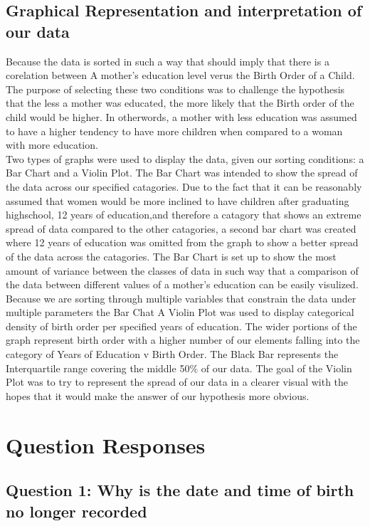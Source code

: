 \documentclass[10pt]{article}
\begin{document}
\subsection{Graphical Representation and interpretation of our data}
Because the data is sorted in such a way that should imply that there is a corelation between A mother's education level verus the Birth Order of a Child.
The purpose of selecting these two conditions was to challenge the hypothesis that the less a mother was educated, the more likely that the Birth order of 
the child would be higher. In otherwords, a mother with less education was assumed to have a higher tendency to have more children when compared to a woman
with more education.\\ Two types of graphs were used to display the data, given our sorting conditions: a Bar Chart and a Violin Plot.
The Bar Chart was intended to show the spread of the data across our specified catagories. Due to the fact that it can be reasonably assumed
that women would be more inclined to have children after graduating highschool, 12 years of education,and therefore a catagory that shows an extreme spread of data compared to the other catagories,
a second bar chart was created where 12 years of education was omitted from the graph to show a better spread of the data across the catagories.
The Bar Chart is set up to show the most amount of variance between the classes of data in such way that a comparison of the data between different
values of a mother's education can be easily visulized. Because we are sorting through multiple variables that constrain the data under multiple parameters
the Bar Chat
A Violin Plot was used to display categorical density of birth order per specified years of education. The wider portions of the graph represent
birth order with a higher number of our elements falling into the category of Years of Education v Birth Order. The Black Bar represents the 
Interquartile range covering the middle 50$\%$ of our data. The goal of the Violin Plot was to try to represent the spread of our data in a clearer 
visual with the hopes that it would make the answer of our hypothesis more obvious. 
\section{Question Responses}
\subsection{Question 1: Why is the date and time of birth no longer recorded}
\end{document}
